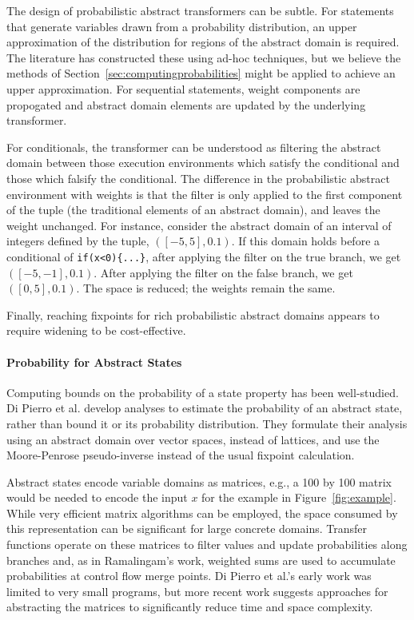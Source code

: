 The design of probabilistic abstract transformers can be subtle.
For statements that generate variables drawn from a probability
distribution, an upper approximation of the distribution for
regions of the abstract domain is required.  The literature
has constructed these using ad-hoc techniques, but we believe
the methods of Section~\ref{sec:computingprobabilities} might be applied to 
achieve an upper approximation.
For sequential statements, weight components are propogated
and abstract domain elements are updated by the underlying transformer.

For conditionals, the transformer can be understood
as filtering the abstract domain between those execution environments which
satisfy the conditional and those which falsify the conditional. 
The difference in the probabilistic abstract environment with weights 
is that the filter is only applied to the first component of
the tuple (the traditional elements of an abstract domain), 
and leaves the weight unchanged.
For instance, consider the abstract domain of an interval of 
integers defined by the tuple, $([-5,5],0.1)$. 
If this domain holds before a conditional of 
{\tt if(x<0)\{...\}}, after applying the filter on the true branch, 
we get $([-5,-1],0.1)$. 
After applying the filter on the false branch, we get $([0,5],0.1)$.
The space is reduced; the weights remain the same.

Finally, reaching fixpoints for rich probabilistic abstract domains
appears to require widening \cite{monniaux2000abstract,esparza2011probabilistic} to be cost-effective.

\paragraph{Probability for Abstract States}

Computing bounds on the probability of a state property has been well-studied.
Di Pierro et al. \cite{di2013probabilistic} develop analyses
to estimate the probability of an abstract state, 
rather than bound it or its probability distribution.  
They formulate their analysis using an abstract 
domain over vector spaces, instead of lattices, and use
the Moore-Penrose pseudo-inverse instead of the usual fixpoint calculation.

Abstract states encode variable domains as matrices, e.g., a 100 by 100 matrix
would be needed to encode the input $x$ for the example in 
Figure~\ref{fig:example}.  While very efficient matrix algorithms
can be employed, the space consumed by this representation can
be significant for large concrete domains.  
Transfer functions operate on these matrices to filter values and
update probabilities along branches and, 
as in Ramalingam's work, weighted sums are used to accumulate probabilities
at control flow merge points.
Di Pierro et al.'s early work was limited to very small 
programs, but more recent
work suggests approaches for abstracting the matrices to significantly
reduce time and space complexity.   

